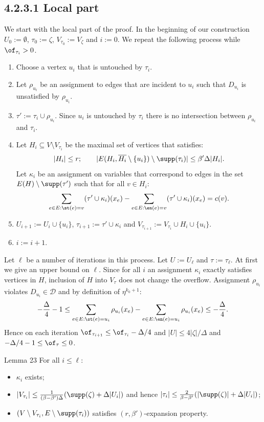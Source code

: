\subsection*{4.2.3.1 Local part}
We start with the local part of the proof. In the beginning of our construction $U_0:=\emptyset$, $\tau_0:=\zeta$, $V_{\tau_0}:=V_\zeta$ and $i:=0$.
We repeat the following process while $\of_{\tau_i}>0$.
\begin{enumerate}
\item Choose a vertex $u_i$ that is untouched by $\tau_i$.
\item Let $\rho_{u_i}$ be an assignment to edges that are incident to $u_i$ such that $D_{u_i}$ is unsatisfied by $\rho_{u_i}$.
\item $\tau':=\tau_i\cup\rho_{u_i}$. Since $u_i$ is untouched by $\tau_i$ there is no intersection between $\rho_{u_i}$ and $\tau_i$.
\item Let $H_i\subseteq V\setminus V_{\tau_i}$ be the maximal set of vertices that satisfies:
\[|H_i|\le r;\qquad |E(H_i,\overline{H_i}\setminus\{u_i\})\setminus\supp(\tau_i)|\le\beta'\Delta|H_i|.\]
Let $\kappa_i$ be an assignment on variables that correspond to edges in the set $E(H)\setminus\supp(\tau')$ such that for all $v\in H_i$:
\[\sum_{e\in E:\st(e)=v}(\tau'\cup\kappa_i)(x_e)-\sum_{e\in E:\en(e)=v}(\tau'\cup\kappa_i)(x_e)=c(v).\]
\item $U_{i+1}:=U_i\cup\{u_i\}$, $\tau_{i+1}:=\tau'\cup\kappa_i$ and $V_{\tau_{i+1}}:=V_{\tau_i}\cup H_i\cup\{u_i\}$.
\item $i:=i+1$.
\end{enumerate}
Let $\ell$ be a number of iterations in this process. Let $U:=U_\ell$ and $\tau:=\tau_\ell$.
At first we give an upper bound on $\ell$. Since for all $i$ an assignment $\kappa_i$ exactly satisfies vertices in $H$, inclusion of $H$ into $V_\tau$ does not change the overflow. Assignment $\rho_{u_i}$ violates $D_{u_i}\in\mathcal D$ and by definition of $\eta^{k_0+1}$:
\[-\frac\Delta4-1\le\sum_{e\in E:\st(e)=u_i}\rho_{u_i}(x_e)-\sum_{e\in E:\en(e)=u_i}\rho_{u_i}(x_e)\le-\frac\Delta4.\]
Hence on each iteration $\of_{\tau_{i+1}}\le\of_{\tau_i}-\Delta/4$ and $|U|\le4|\zeta|/\Delta$ and $-\Delta/4-1\le\of_\tau\le0$.
\begin{result}{Lemma 23}
For all $i\le\ell$:
\begin{itemize}\item $\kappa_i$ exists;
\item $|V_{\tau_i}|\le\frac{1}{(\beta-\beta')\Delta}(\supp(\zeta)+\Delta|U_i|)$ and hence $|\tau_i|\le\frac{2}{\beta-\beta'}(|\supp(\zeta)|+\Delta|U_i|)$;
\item $(V\setminus V_{\tau_i},E\setminus\supp(\tau_i))$ satisfies $(r,\beta')$-expansion property.\end{itemize}
\end{result}
